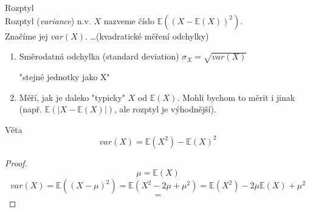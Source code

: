 \documentclass[../main.tex]{subfiles}
\begin{document}
\begin{definition}
    Rozptyl\\

    Rozptyl (\textit{variance}) n.v. $X$ nazveme číslo $\mathbb{E}((X-\mathbb{E}(X))^2)$.\\
    Značíme jej $var(X)$. \dots (kvadratické měření odchylky)
    \begin{enumerate}
        \item Směrodatná odchylka (standard deviation) $\sigma_X = \sqrt{var(X)}$
        \begin{remark}
            "stejné jednotky jako X"
        \end{remark}
        \item Měří, jak je daleko "typicky" $X$ od $\mathbb{E}(X)$. Mohli bychom to měrit i jinak 
        (např. $\mathbb{E}(|X-\mathbb{E}(X)|)$, ale rozptyl je výhodnější).
    \end{enumerate}
\end{definition}
\begin{theorem}
    Věta\\
    \[var(X) = \mathbb{E}(X^2) - \mathbb{E}(X)^2\]
    \begin{proof}
        \[\mu = \mathbb{E}(X)\]
        \[var(X) = \mathbb{E}((X - \mu)^2) = \mathbb{E}(X^2-2\mu + \mu^2) = \mathbb{E}(X^2) - 2\mu \mathbb{E}(X) + \mu^2\]
        \[ = \]
    \end{proof}
\end{theorem}
\end{document}
